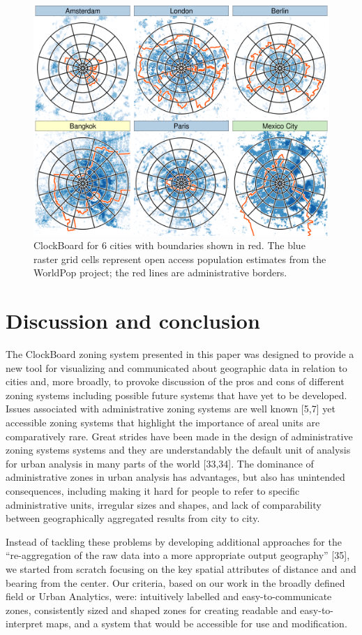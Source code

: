 \documentclass{josis}
\begin{document}
\begin{figure}

{\centering \includegraphics[width=0.7\linewidth]{cities_p1} 

}

\caption{ClockBoard for 6 cities with boundaries shown in red. The blue raster grid cells represent open access population estimates from the WorldPop project; the red lines are administrative borders.}\label{fig:popdens2}
\end{figure}

\hypertarget{discussion}{%
\section{Discussion and conclusion}\label{discussion}}

The ClockBoard zoning system presented in this paper was designed to provide a new tool for visualizing and communicated about geographic data in relation to cities and, more broadly, to provoke discussion of the pros and cons of different zoning systems including possible future systems that have yet to be developed.
Issues associated with administrative zoning systems are well known {[}5,7{]} yet accessible zoning systems that highlight the importance of areal units are comparatively rare.
Great strides have been made in the design of administrative zoning systems systems and they are understandably the default unit of analysis for urban analysis in many parts of the world {[}33,34{]}.
The dominance of administrative zones in urban analysis has advantages, but also has unintended consequences, including making it hard for people to refer to specific administrative units, irregular sizes and shapes, and lack of comparability between geographically aggregated results from city to city.

Instead of tackling these problems by developing additional approaches for the ``re-aggregation of the raw data into a more
appropriate output geography'' {[}35{]}, we started from scratch focusing on the key spatial attributes of distance and and bearing from the center.
Our criteria, based on our work in the broadly defined field or Urban Analytics, were: intuitively labelled and easy-to-communicate zones, consistently sized and shaped zones for creating readable and easy-to-interpret maps, and a system that would be accessible for use and modification.
\end{document}
